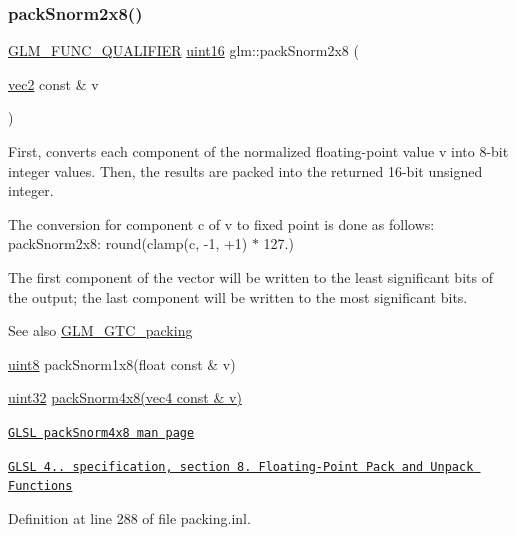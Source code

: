 \subsubsection{\texorpdfstring{pack\+Snorm2x8()}{packSnorm2x8()}}
{\footnotesize\ttfamily \hyperlink{setup_8hpp_a33fdea6f91c5f834105f7415e2a64407}{G\+L\+M\+\_\+\+F\+U\+N\+C\+\_\+\+Q\+U\+A\+L\+I\+F\+I\+ER} \hyperlink{group__gtc__type__precision_gad8c2939e1fdd8e5828b31d95c52255d5}{uint16} glm\+::pack\+Snorm2x8 (\begin{DoxyParamCaption}\item[{\hyperlink{group__core__types_gaa1618f51db67eaa145db101d8c8431d8}{vec2} const \&}]{v }\end{DoxyParamCaption})}

First, converts each component of the normalized floating-\/point value v into 8-\/bit integer values. Then, the results are packed into the returned 16-\/bit unsigned integer.

The conversion for component c of v to fixed point is done as follows\+: pack\+Snorm2x8\+: round(clamp(c, -\/1, +1) $\ast$ 127.)

The first component of the vector will be written to the least significant bits of the output; the last component will be written to the most significant bits.

\begin{DoxySeeAlso}{See also}
\hyperlink{group__gtc__packing}{G\+L\+M\+\_\+\+G\+T\+C\+\_\+packing} 

\hyperlink{group__gtc__type__precision_ga1a7dcd8aac97cc8020817c94049deff2}{uint8} pack\+Snorm1x8(float const \& v) 

\hyperlink{group__gtc__type__precision_ga202b6a53c105fcb7e531f9b443518451}{uint32} \hyperlink{group__core__func__packing_gafcf25acc0d361c6c696a433aa5dfd16b}{pack\+Snorm4x8(vec4 const \& v)} 

\href{http://www.opengl.org/sdk/docs/manglsl/xhtml/packSnorm4x8.xml}{\tt G\+L\+SL pack\+Snorm4x8 man page} 

\href{http://www.opengl.org/registry/doc/GLSLangSpec.4.20.8.pdf}{\tt G\+L\+SL 4.. specification, section 8. Floating-\/\+Point Pack and Unpack Functions} 
\end{DoxySeeAlso}


Definition at line 288 of file packing.\+inl.

\mbox{\label{group__gtc__packing_ga0d4157cec37c0312216a7be1cc92df54}} 
